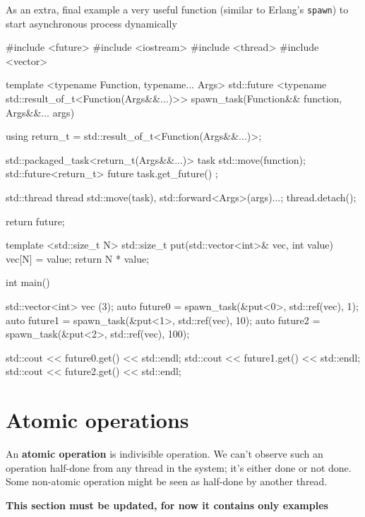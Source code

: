 \documentclass[../main]{subfiles}
\begin{document}
    As an extra, final example a very useful function (similar to Erlang's \texttt{spawn})
to start asynchronous process dynamically
\begin{Code}
    #include <future>
    #include <iostream>
    #include <thread>
    #include <vector>

    template <typename Function, typename... Args>
    std::future <typename std::result_of_t<Function(Args&&...)>>
    spawn_task(Function&& function, Args&&... args)
    {
        using return_t = std::result_of_t<Function(Args&&...)>;

        std::packaged_task<return_t(Args&&...)> task {std::move(function)};
        std::future<return_t> future { task.get_future() };

        std::thread thread {std::move(task), std::forward<Args>(args)...};
        thread.detach();

        return future;
    }

    template <std::size_t N>
    std::size_t put(std::vector<int>& vec, int value)
    {
        vec[N] = value;
        return N * value;
    }

    int main()
    {
        std::vector<int> vec (3);
        auto future0 = spawn_task(&put<0>, std::ref(vec), 1);
        auto future1 = spawn_task(&put<1>, std::ref(vec), 10);
        auto future2 = spawn_task(&put<2>, std::ref(vec), 100);

        std::cout << future0.get() << std::endl;
        std::cout << future1.get() << std::endl;
        std::cout << future2.get() << std::endl;
    }
\end{Code}

\section{Atomic operations}
    An \textbf{atomic operation} is indivisible operation. We can't observe such an operation half-done from any thread in the system;
it's either done or not done. Some non-atomic operation might be seen as half-done by another thread.\newline

\begin{center}
    \textbf{This section must be updated, for now it contains only examples}
\end{center}
\end{document}
